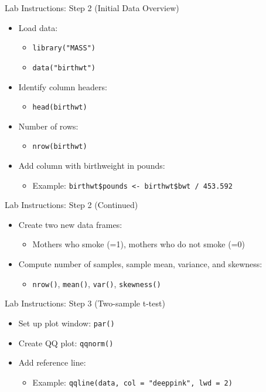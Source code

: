 \documentclass{beamer}
\begin{document}
\begin{frame}{Lab Instructions: Step 2 (Initial Data Overview)}
\begin{itemize}
    \item Load data:
    \begin{itemize}
        \item \texttt{library("MASS")}
        \item \texttt{data("birthwt")}
    \end{itemize}
    \item Identify column headers:
    \begin{itemize}
        \item \texttt{head(birthwt)}
    \end{itemize}
    \item Number of rows:
    \begin{itemize}
        \item \texttt{nrow(birthwt)}
    \end{itemize}
    \item Add column with birthweight in pounds:
    \begin{itemize}
        \item Example: \texttt{birthwt\$pounds <- birthwt\$bwt / 453.592}
    \end{itemize}
\end{itemize}
\end{frame}

\begin{frame}{Lab Instructions: Step 2 (Continued)}
\begin{itemize}
    \item Create two new data frames:
    \begin{itemize}
        \item Mothers who smoke (=1), mothers who do not smoke (=0)
    \end{itemize}
    \item Compute number of samples, sample mean, variance, and skewness:
    \begin{itemize}
        \item \texttt{nrow()}, \texttt{mean()}, \texttt{var()}, \texttt{skewness()}
    \end{itemize}
\end{itemize}
\end{frame}

\begin{frame}{Lab Instructions: Step 3 (Two-sample t-test)}
\begin{itemize}
    \item Set up plot window: \texttt{par()}
    \item Create QQ plot: \texttt{qqnorm()}
    \item Add reference line:
    \begin{itemize}
        \item Example: \texttt{qqline(data, col = "deeppink", lwd = 2)}
    \end{itemize}
\end{itemize}
\end{frame}
\end{document}
